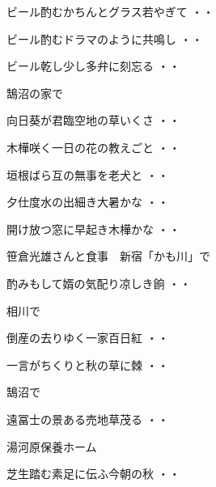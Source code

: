 \begin{shiika}ビール酌むかちんとグラス若やぎて
\hfill{・・}\end{shiika}
\begin{shiika}ビール酌むドラマのように共鳴し
\hfill{・・}\end{shiika}
\begin{shiika}ビール乾し少し多弁に刻忘る
\hfill{・・}\end{shiika}
\vspace{0.6cm}
鵠沼の家で
\begin{shiika}向日葵が君臨空地の草いくさ
\hfill{・・}\end{shiika}
\begin{shiika}木樺咲く一日の花の教えごと
\hfill{・・}\end{shiika}
\begin{shiika}垣根ばら互の無事を老犬と
\hfill{・・}\end{shiika}
\begin{shiika}夕仕度水の出細き大暑かな
\hfill{・・}\end{shiika}
\begin{shiika}開け放つ窓に早起き木樺かな
\hfill{・・}\end{shiika}
\vspace{0.6cm}
笹倉光雄さんと食事　新宿「かも川」で
\begin{shiika}酌みもして婿の気配り凉しき餉
\hfill{・・}\end{shiika}
\vspace{0.6cm}
相川で
\begin{shiika}倒産の去りゆく一家百日紅
\hfill{・・}\end{shiika}
\vspace{0.6cm}
\begin{shiika}一言がちくりと秋の草に棘
\hfill{・・}\end{shiika}
\vspace{0.6cm}
鵠沼で
\begin{shiika}遠冨士の景ある売地草茂る
\hfill{・・}\end{shiika}
\vspace{0.6cm}
湯河原保養ホーム
\begin{shiika}芝生踏む素足に伝ふ今朝の秋
\hfill{・・}\end{shiika}
